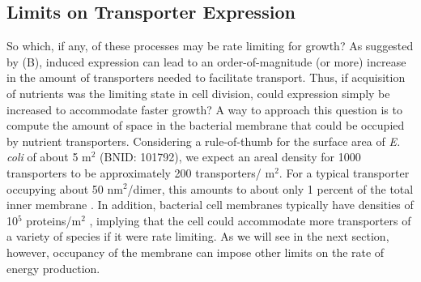 \subsection{Limits on Transporter Expression}
So which, if any, of these processes may be rate limiting for growth? As
suggested by (B), induced expression can lead to an
order-of-magnitude (or more) increase in the amount of transporters needed to
facilitate transport. Thus, if acquisition of nutrients was the limiting state
in cell division, could expression simply be increased to accommodate faster
growth? A way to approach this question is to compute the amount of space in the
bacterial membrane that could be occupied by nutrient transporters. Considering a rule-of-thumb for the surface area of
\textit{E. coli} of about 5 \textmu m$^2$ (BNID: 101792), we expect
an areal density for 1000 transporters to be approximately 200
transporters/ \textmu m$^2$. For a typical transporter occupying about 50
nm$^2$/dimer, this amounts to about only 1 percent of the total inner membrane
\citep{szenk2017}. In addition, bacterial cell membranes typically have
densities of 10$^5$ proteins/\textmu m$^2$ \citep{phillips2018}, implying that the
cell could accommodate more transporters of a variety of species if it were rate
limiting. As we will see in the next section, however, occupancy of the membrane can
impose other limits on the rate of energy production.
